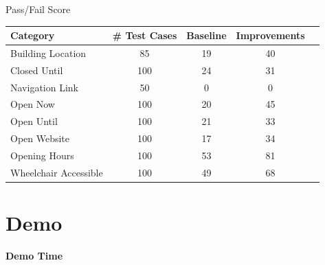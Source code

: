 \documentclass{sdqbeamer}[smallfoot]
\begin{document}
\begin{frame}[t]{Pass/Fail Score}
\begin{table}[H]
    \centering
        \begin{tabular}{|l|c|c|c|c|}
        \hline
        \textbf{Category} & \textbf{\# Test Cases} & \textbf{Baseline} & \textbf{Improvements} \\
        \hline
        Building Location     & 85  & 19  & 40 \\
        Closed Until          & 100 & 24  & 31 \\
        Navigation Link       & 50  & 0   & 0  \\
        Open Now              & 100 & 20  & 45 \\
        Open Until            & 100 & 21  & 33 \\
        Open Website          & 100 & 17  & 34 \\
        Opening Hours         & 100 & 53  & 81 \\
        Wheelchair Accessible & 100 & 49  & 68 \\
        \hline
    \end{tabular}
\end{table}
\end{frame}

\section{Demo}
\begin{frame}{}
    \vspace{1.5cm}
    \centering
    \fontsize{100pt}{55pt}\selectfont \textcolor{kit-green100}{\textbf{Demo Time}}
\end{frame}
\end{document}
